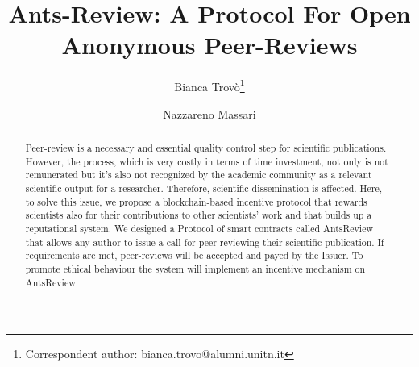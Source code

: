 \documentclass[runningheads]{llncs}
\begin{document}
%
\title{Ants-Review: A Protocol For Open Anonymous Peer-Reviews}
%
%
\author{Bianca Trovò\thanks{Correspondent author: bianca.trovo@alumni.unitn.it} \and
Nazzareno Massari}
%
%
%
\maketitle              %
%
\begin{abstract}
Peer-review is a necessary and essential quality control step for scientific publications. However, the process, which is very costly in terms of time investment, not only is not remunerated but it’s also not recognized by the academic community as a relevant scientific output for a researcher. Therefore, scientific dissemination is affected. Here, to solve this issue, we propose a blockchain-based incentive protocol that rewards scientists also for their contributions to other scientists’ work and that builds up a reputational system. We designed a Protocol of smart contracts called AntsReview that allows any author to issue a call for peer-reviewing their scientific publication. If requirements are met, peer-reviews will be accepted and payed by the Issuer. To promote ethical behaviour the system will implement an incentive mechanism on AntsReview.
\end{abstract}
%
%
\end{document}
